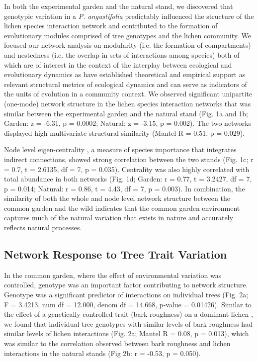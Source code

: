 \documentclass[fleqn,10pt]{wlscirep}
\begin{document}
In both the experimental garden and the natural stand, we discovered
that genotypic variation in a \textit{P. angustifolia} predictably
influenced the structure of the lichen species interaction network and
contributed to the formation of evolutionary modules comprised of tree
genotypes and the lichen community.  We focused our network analysis
on modularity (i.e. the formation of compartments) and nestedness
(i.e. the overlap in sets of interactions among species) both of which
are of interest in the context of the interplay between ecological and
evolutionary dynamics as have established theoretical and empirical
support as relevant structural metrics of ecological dynamics and can
serve as indicators of the units of evolution in a community context.
We observed significant unipartite (one-mode) network structure
\cite{Araujo2011} in the lichen species interaction networks that was
similar between the experimental garden and the natural stand (Fig. 1a
and 1b; Garden: z = -6.31, p = 0.0002; Natural: z = -3.15, p =
0.002). The two networks displayed high multivariate structural
similarity (Mantel R = 0.51, p = 0.029).

Node level eigen-centrality \cite{DeAngelis1989}, a measure of species
importance that integrates indirect connections, showed strong
correlation between the two stands (Fig. 1c; r = 0.7, t = 2.6135, df =
7, p = 0.035). Centrality was also highly correlated with total
abundance in both networks (Fig. 1d; Garden: r = 0.77, t = 3.2427, df
= 7, p = 0.014; Natural:  r = 0.86, t = 4.43, df = 7, p = 0.003). In
combination, the similarity of both the whole and node level network
structure between the common garden and the wild indicates that the
common garden environment captures much of the natural variation that
exists in nature and accurately reflects natural processes.

\subsection*{Network Response to Tree Trait Variation}

In the common garden, where the effect of environmental variation was
controlled, genotype was an important factor contributing to network
structure. Genotype was a significant predictor of interactions on
individual trees (Fig. 2a; F = 3.4213, num df = 12.000, denom df =
14.668, p-value = 0.01426). Similar to the effect of a genetically
controlled trait (bark roughness) on a dominant lichen
\cite{Ellison2005}, we found that individual tree genotypes with
similar levels of bark roughness had similar levels of lichen
interactions (Fig. 2a; Mantel R = 0.08, p = 0.013), which was similar
to the correlation observed between bark roughness and lichen
interactions in the natural stands (Fig 2b: r = -0.53, p = 0.050).
\end{document}
